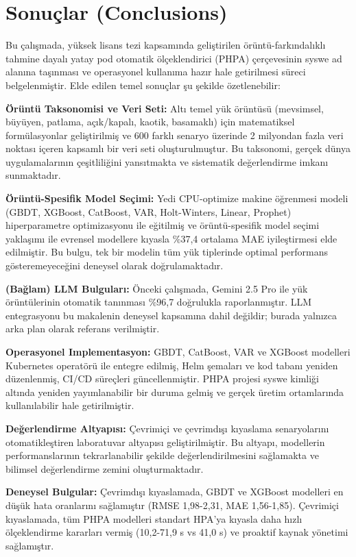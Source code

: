 
\section{Sonuçlar (Conclusions)}

Bu çalışmada, yüksek lisans tezi kapsamında geliştirilen örüntü-farkındalıklı tahmine dayalı yatay pod otomatik ölçeklendirici (PHPA) çerçevesinin syswe ad alanına taşınması ve operasyonel kullanıma hazır hale getirilmesi süreci belgelenmiştir. Elde edilen temel sonuçlar şu şekilde özetlenebilir:

\textbf{Örüntü Taksonomisi ve Veri Seti:} Altı temel yük örüntüsü (mevsimsel, büyüyen, patlama, açık/kapalı, kaotik, basamaklı) için matematiksel formülasyonlar geliştirilmiş ve 600 farklı senaryo üzerinde 2 milyondan fazla veri noktası içeren kapsamlı bir veri seti oluşturulmuştur. Bu taksonomi, gerçek dünya uygulamalarının çeşitliliğini yansıtmakta ve sistematik değerlendirme imkanı sunmaktadır.

\textbf{Örüntü-Spesifik Model Seçimi:} Yedi CPU-optimize makine öğrenmesi modeli (GBDT, XGBoost, CatBoost, VAR, Holt-Winters, Linear, Prophet) hiperparametre optimizasyonu ile eğitilmiş ve örüntü-spesifik model seçimi yaklaşımı ile evrensel modellere kıyasla \%37,4 ortalama MAE iyileştirmesi elde edilmiştir. Bu bulgu, tek bir modelin tüm yük tiplerinde optimal performans gösteremeyeceğini deneysel olarak doğrulamaktadır.

\textbf{(Bağlam) LLM Bulguları:} Önceki çalışmada, Gemini 2.5 Pro ile yük örüntülerinin otomatik tanınması \%96,7 doğrulukla raporlanmıştır. LLM entegrasyonu bu makalenin deneysel kapsamına dahil değildir; burada yalnızca arka plan olarak referans verilmiştir.

\textbf{Operasyonel Implementasyon:} GBDT, CatBoost, VAR ve XGBoost modelleri Kubernetes operatörü ile entegre edilmiş, Helm şemaları ve kod tabanı yeniden düzenlenmiş, CI/CD süreçleri güncellenmiştir. PHPA projesi syswe kimliği altında yeniden yayımlanabilir bir duruma gelmiş ve gerçek üretim ortamlarında kullanılabilir hale getirilmiştir.

\textbf{Değerlendirme Altyapısı:} Çevrimiçi ve çevrimdışı kıyaslama senaryolarını otomatikleştiren laboratuvar altyapısı geliştirilmiştir. Bu altyapı, modellerin performanslarının tekrarlanabilir şekilde değerlendirilmesini sağlamakta ve bilimsel değerlendirme zemini oluşturmaktadır.

\textbf{Deneysel Bulgular:} Çevrimdışı kıyaslamada, GBDT ve XGBoost modelleri en düşük hata oranlarını sağlamıştır (RMSE 1,98-2,31, MAE 1,56-1,85). Çevrimiçi kıyaslamada, tüm PHPA modelleri standart HPA'ya kıyasla daha hızlı ölçeklendirme kararları vermiş (10,2-71,9 s vs 41,0 s) ve proaktif kaynak yönetimi sağlamıştır.


